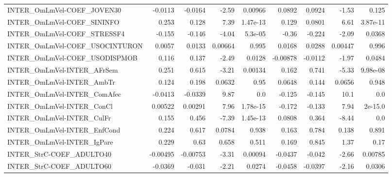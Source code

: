 \begin{tabular}{lrrrrrrrr}
INTER\_OmLmVel-COEF\_JOVEN30             &     -0.0113 &      -0.0164 &   -2.59 &  0.00966 &     0.0892 &      0.0924 &        -1.53 &         0.125 \\
INTER\_OmLmVel-COEF\_SININFO             &       0.253 &        0.128 &    7.39 & 1.47e-13 &      0.129 &      0.0801 &         6.61 &      3.87e-11 \\
INTER\_OmLmVel-COEF\_STRESSF4            &      -0.155 &       -0.146 &   -4.04 &  5.3e-05 &      -0.36 &      -0.224 &        -2.09 &        0.0368 \\
INTER\_OmLmVel-COEF\_USOCINTURON         &      0.0057 &       0.0133 & 0.00664 &    0.995 &     0.0168 &      0.0288 &      0.00447 &         0.996 \\
INTER\_OmLmVel-COEF\_USODISPMOB          &       0.116 &        0.137 &   -2.49 &   0.0128 &   -0.00878 &     -0.0112 &        -1.97 &        0.0484 \\
INTER\_OmLmVel-INTER\_AFrSem             &       0.251 &        0.615 &   -3.21 &  0.00134 &      0.162 &       0.741 &        -5.33 &      9.98e-08 \\
INTER\_OmLmVel-INTER\_AmbTr              &       0.124 &        0.198 &  0.0632 &     0.95 &     0.0648 &       0.144 &       0.0656 &         0.948 \\
INTER\_OmLmVel-INTER\_ComAfec            &     -0.0413 &      -0.0339 &    9.87 &      0.0 &     -0.125 &      -0.145 &         10.1 &           0.0 \\
INTER\_OmLmVel-INTER\_ConCl              &     0.00522 &      0.00291 &    7.96 & 1.78e-15 &     -0.172 &      -0.133 &         7.94 &       2e-15.0 \\
INTER\_OmLmVel-INTER\_CulFr              &       0.155 &        0.456 &   -7.39 & 1.45e-13 &     0.0808 &       0.364 &        -8.44 &           0.0 \\
INTER\_OmLmVel-INTER\_EnfCond            &       0.224 &        0.617 &  0.0784 &    0.938 &      0.163 &       0.784 &        0.138 &         0.891 \\
INTER\_OmLmVel-INTER\_IgPare             &       0.229 &         0.63 &   0.658 &    0.511 &      0.169 &       0.845 &         1.37 &          0.17 \\
INTER\_StrC-COEF\_ADULTO40               &    -0.00495 &     -0.00753 &   -3.31 &  0.00094 &    -0.0437 &      -0.042 &        -2.66 &       0.00785 \\
INTER\_StrC-COEF\_ADULTO60               &     -0.0369 &       -0.031 &   -2.21 &   0.0274 &    -0.0458 &     -0.0397 &        -2.16 &        0.0306 \\

\end{tabular}
